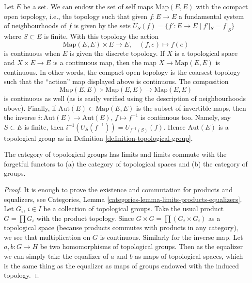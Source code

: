 \begin{example}
\label{example-automorphisms-of-a-set}
Let $E$ be a set. We can endow the set of self maps $\text{Map}(E, E)$
with the compact open topology, i.e., the topology such that given
$f : E \to E$ a fundamental system of neighbourhoods of $f$ is given
by the sets $U_S(f) = \{f' : E \to E \mid f'|_S = f|_S\}$ where
$S \subset E$ is finite. With this topology the action
$$
\text{Map}(E, E) \times E \longrightarrow E,\quad
(f, e) \longmapsto f(e)
$$
is continuous when $E$ is given the discrete topology. If $X$
is a topological space and $X \times E \to E$ is a continuous map,
then the map $X \to \text{Map}(E, E)$ is continuous. In other
words, the compact open topology is the coarsest topology
such that the ``action'' map displayed above is continuous. The composition
$$
\text{Map}(E, E) \times \text{Map}(E, E) \to \text{Map}(E, E)
$$
is continuous as well (as is easily verified using the description
of neighbourhoods above). Finally, if $\text{Aut}(E) \subset \text{Map}(E, E)$
is the subset of invertible maps, then the inverse
$i : \text{Aut}(E) \to \text{Aut}(E)$, $f \mapsto f^{-1}$ is
continuous too. Namely, say $S \subset E$ is finite, then
$i^{-1}(U_S(f^{-1})) = U_{f^{-1}(S)}(f)$. Hence
$\text{Aut}(E)$ is a topological group as in
Definition \ref{definition-topological-group}.
\end{example}

\begin{lemma}
\label{lemma-topological-group-limits}
The category of topological groups has limits and limits commute
with the forgetful functors to (a) the category of topological spaces and
(b) the category of groups.
\end{lemma}

\begin{proof}
It is enough to prove the existence and commutation for products and
equalizers, see
Categories, Lemma \ref{categories-lemma-limits-products-equalizers}.
Let $G_i$, $i \in I$ be a collection of topological groups.
Take the usual product $G = \prod G_i$ with the product topology.
Since $G \times G = \prod (G_i \times G_i)$ as a topological space
(because products commutes with products in any category), we
see that multiplication on $G$ is continuous. Similarly for
the inverse map. Let $a, b : G \to H$ be two homomorphisms of
topological groups. Then as the equalizer we can simply take
the equalizer of $a$ and $b$ as maps of topological spaces,
which is the same thing as the equalizer as maps of groups
endowed with the induced topology.
\end{proof}

